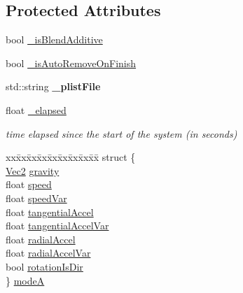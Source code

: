 \subsection*{Protected Attributes}
\begin{DoxyCompactItemize}
\item 
bool \hyperlink{classParticleSystem_a620cfdfb0854ad1be32190b465e5ce0c}{\+\_\+is\+Blend\+Additive}
\item 
bool \hyperlink{classParticleSystem_af8f2c300130fcf1ba2554e7a5af0e8c9}{\+\_\+is\+Auto\+Remove\+On\+Finish}
\item 
\mbox{\label{classParticleSystem_ae119a86fd10960cd4bf4ef9537956431}} 
std\+::string {\bfseries \+\_\+plist\+File}
\item 
\mbox{\label{classParticleSystem_a911a21dc979ea5b1b46d471b2e46846c}} 
float \hyperlink{classParticleSystem_a911a21dc979ea5b1b46d471b2e46846c}{\+\_\+elapsed}
\begin{DoxyCompactList}\small\item\em time elapsed since the start of the system (in seconds) \end{DoxyCompactList}\item 
\mbox{\label{classParticleSystem_a2e595b464990d2f2517a2473b3f23516}} 
\begin{tabbing}
xx\=xx\=xx\=xx\=xx\=xx\=xx\=xx\=xx\=\kill
struct \{\\
\>\hyperlink{classVec2}{Vec2} \hyperlink{classParticleSystem_a8f381b887187f315e5ce335889f678e0}{gravity}\\
\>float \hyperlink{classParticleSystem_a1a4bba0d174d86e0a941b71c1d485b50}{speed}\\
\>float \hyperlink{classParticleSystem_a6b25942f1c1d36f31433c52c042174c6}{speedVar}\\
\>float \hyperlink{classParticleSystem_a64fc03277893b0fa596fa69e692c5688}{tangentialAccel}\\
\>float \hyperlink{classParticleSystem_a75e4c8029b3b28e0d06e746f0e9562ae}{tangentialAccelVar}\\
\>float \hyperlink{classParticleSystem_aad9eb3f8a37e03d92ec09d2146248ff5}{radialAccel}\\
\>float \hyperlink{classParticleSystem_aac80efb97ad54c4f23de9801661d4f9f}{radialAccelVar}\\
\>bool \hyperlink{classParticleSystem_a2a393acfe59bd8a950007b642e596849}{rotationIsDir}\\
\} \hyperlink{classParticleSystem_a2e595b464990d2f2517a2473b3f23516}{modeA}\\


\end{tabbing}
\end{DoxyCompactItemize}

